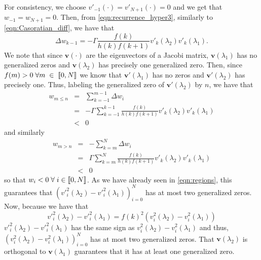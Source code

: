    For consistency, we choose $v'_{-1}(\cdot)=v'_{N+1}(\cdot)=0$ and we get that $w_{-1}=w_{N+1}=0$. Then, from \cref{eqn:recurrence_hyper3}, similarly to \cref{eqn:Casoratian_diff}, we have that
    \begin{equation}
    	\Delta w_{k-1} = -\Gamma\frac{f(k)}{h(k)f(k+1)}v'_k(\lambda_2)v'_k(\lambda_1).
    \end{equation}
    We note that since $\mathbf{v}(\cdot)$ are the eigenvectors of a Jacobi matrix, $\mathbf{v}(\lambda_1)$ has no generalized zeros and $\mathbf{v}(\lambda_2)$ has precisely one generalized zero. Then, since $f(m)>0 \; \forall m \; \in \; \left \llbracket 0 , N \right \rrbracket$ we know that $\mathbf{v'}(\lambda_1)$ has no zeros and $\mathbf{v'}(\lambda_2)$ has precisely one. Thus, labeling the generalized zero of $\mathbf{v'}(\lambda_2)$ by $n$, we have that
    \begin{eqnarray}
    	w_{m\leq n} &=& \sum_{k=-1}^{m-1}\Delta w_i						\\
    	&=&-\Gamma \sum_{k=-1}^{k-1}\frac{f(k)}{h(k)f(k+1)}v'_k(\lambda_2)v'_k(\lambda_1)	\\
    	&<& 0
    \end{eqnarray}
    and similarly
    \begin{eqnarray}
    	w_{m > n} &=& -\sum_{k=m}^{N}\Delta w_i						\\
    	&=& \Gamma \sum_{k=m}^{N}\frac{f(k)}{h(k)f(k+1)}v'_k(\lambda_2)v'_k(\lambda_1)	\\
    	&<& 0
    \end{eqnarray}
    so that $w_i < 0 \; \forall \; i \in \left \llbracket 0 , N \right \rrbracket$. As we have already seen in \cref{eqn:regions}, this guarantees that $\left({v'}_i^2(\lambda_2)-{v'}_i^2(\lambda_1)\right)_{i=0}^{N}$ has at most two generalized zeros. Now, because we have that
    \begin{equation}
    	{v'}_i^2(\lambda_2)-{v'}_i^2(\lambda_1) = f(k)^2\left(v_i^2(\lambda_2)-v_i^2(\lambda_1)\right)
    \end{equation}
    ${v'}_i^2(\lambda_2)-{v'}_i^2(\lambda_1)$ has the same sign as $v_i^2(\lambda_2)-v_i^2(\lambda_1)$ and thus, $\left(v_i^2(\lambda_2)-v_i^2(\lambda_1)\right)_{i=0}^{N}$ has at most two generalized zeros. That $\mathbf{v}(\lambda_2)$ is orthogonal to $\mathbf{v}(\lambda_1)$ guarantees that it has at least one generalized zero.

